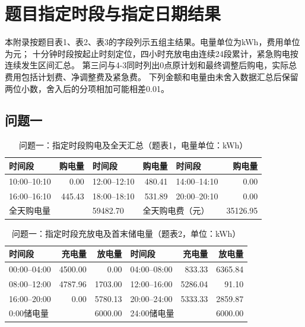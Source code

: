 \clearpage
\section{题目指定时段与指定日期结果}
\label{sec:required-results}
本附录按题目表1、表2、表3的字段列示五组主结果。电量单位为kWh，费用单位为元；
十分钟时段按起止时刻定位，四小时充放电由连续24段累计，紧急购电按连续发生区间汇总。
第三问与4-3同时列出0点原计划和最终调整后购电，实际总费用包括计划费、净调整费及紧急费。
下列金额和电量由未舍入数据汇总后保留两位小数，舍入后的分项相加可能相差0.01。

\subsection{问题一}
\begin{table}[H]
\centering\footnotesize
\setlength{\tabcolsep}{4pt}
\caption{问题一：指定时段购电及全天汇总（题表1，电量单位：kWh）}
\label{tab:required-q1-grid}
\begin{tabular}{@{}lrlrlr@{}}
\toprule
时间段 & 购电量 & 时间段 & 购电量 & 时间段 & 购电量 \\
\midrule
10:00--10:10 & 0.00 & 12:00--12:10 & 480.41 & 14:00--14:10 & 0.00 \\
16:00--16:10 & 445.43 & 18:00--18:10 & 531.89 & 20:00--20:10 & 0.00 \\
\multicolumn{2}{l}{全天购电量} & 59482.70 & \multicolumn{2}{l}{全天购电费（元）} & 35126.95 \\
\bottomrule
\end{tabular}
\end{table}

\begin{table}[H]
\centering\footnotesize
\setlength{\tabcolsep}{4pt}
\caption{问题一：指定时段充放电及首末储电量（题表2，单位：kWh）}
\label{tab:required-q1-storage}
\begin{tabular}{@{}lrrlrr@{}}
\toprule
时间段 & 充电量 & 放电量 & 时间段 & 充电量 & 放电量 \\
\midrule
00:00--04:00 & 4500.00 & 0.00 & 04:00--08:00 & 833.33 & 6365.84 \\
08:00--12:00 & 4787.96 & 1703.00 & 12:00--16:00 & 5286.04 & 91.10 \\
16:00--20:00 & 0.00 & 5780.13 & 20:00--24:00 & 5333.33 & 2859.87 \\
\multicolumn{2}{l}{0:00储电量} & 6000.00 & \multicolumn{2}{l}{24:00储电量} & 6000.00 \\
\bottomrule
\end{tabular}
\end{table}

